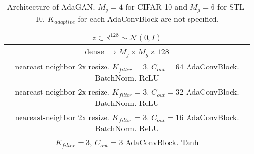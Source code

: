 \documentclass{article} %
\begin{document}
\begin{table}[t]
\caption{Architecture of AdaGAN. $M_g = 4$ for CIFAR-10 and $M_g = 6$ for STL-10. $K_{adaptive}$ for each AdaConvBlock are not specified.}
\label{table:ada-conv-full-generator}
\begin{center}
\begin{tabular}{c}
\hline
$z \in \mathbb{R}^{128} \sim \mathcal{N}(0,I) $ \\ \hline
dense $\rightarrow M_g \times M_g \times 128$ \\ \hline
neareast-neighbor 2x resize. $K_{filter}=3$, $C_{out}=64$ AdaConvBlock. BatchNorm. ReLU \\ \hline
neareast-neighbor 2x resize. $K_{filter}=3$, $C_{out}=32$ AdaConvBlock. BatchNorm. ReLU \\ \hline
neareast-neighbor 2x resize. $K_{filter}=3$, $C_{out}=16$ AdaConvBlock. BatchNorm. ReLU \\ \hline
$K_{filter}=3$, $C_{out}=3$ AdaConvBlock. Tanh \\ \hline
\end{tabular}
\end{center}
\end{table}
\end{document}
